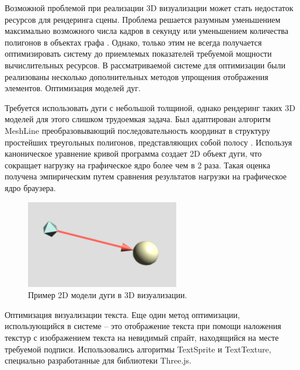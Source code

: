 Возможной проблемой при реализации 3D визуализации может стать недостаток ресурсов для рендеринга сцены. Проблема решается разумным уменьшением максимально возможного числа кадров в секунду или уменьшением количества полигонов в объектах графа \cite{FastMultiDimensionalAlgorithmforDrawingLargeGraphs} \cite{Anewmethodtooptimizefor3Dlargegraphdrawing}. Однако, только этим не всегда получается оптимизировать систему до приемлемых показателей требуемой мощности вычислительных ресурсов. В рассматриваемой системе для оптимизации были реализованы несколько дополнительных методов упрощения отображения элементов.
Оптимизация моделей дуг.

Требуется использовать дуги с небольшой толщиной, однако рендеринг таких 3D моделей для этого слишком трудоемкая задача. Был адаптирован алгоритм MeshLine преобразовывающий последовательность координат в структуру простейших треугольных полигонов, представляющих собой полосу \cite{MeshLine_github}. Используя каноническое уравнение кривой программа создает 2D объект дуги, что сокращает нагрузку на графическое ядро более чем в 2 раза. Такая оценка получена эмпирическим путем сравнения результатов нагрузки на графическое ядро браузера.

\begin{figure}[!ht]
    \centering
    \includegraphics[width=0.6\textwidth]{assets/optimization_1.png}
    \caption{Пример 2D модели дуги в 3D визуализации.}
    \label{fig:opt_1}
\end{figure}

Оптимизация визуализации текста.
Еще один метод оптимизации, использующийся в системе – это отображение текста при помощи наложения текстур с изображением текста на невидимый спрайт, находящийся на месте требуемой подписи. Использовались алгоритмы TextSprite и TextTexture, специально разработанные для библиотеки Three.js. \cite{TextSprite_github} \cite{TextTexture_github}

